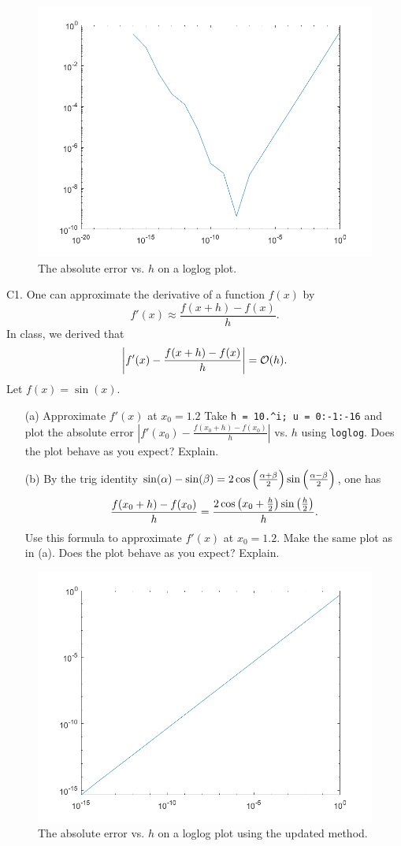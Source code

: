 \documentclass[12pt]{report}
\begin{document}
\begin{figure}
    \center
    \includegraphics[width=.8\textwidth]{plots/c1a.png}
    \caption{The absolute error vs. $h$ on a loglog plot.}
\end{figure}
\begin{problem}
    C1. One can approximate the derivative of a function $f(x)$ by
    \[ 
        f'(x) \approx \frac{f(x + h) - f(x)}{h}.
    \]
    In class, we derived that
    \[ 
        \left| f'(x) - \frac{f(x + h) - f(x)}{h}\right| = {\mathcal{O}}(h).
    \]
    Let $f(x) = \sin(x)$. 
    \begin{enumerate}
        \item [(a)] Approximate $f'(x)$ at $x_0 = 1.2$ Take \verb+h = 10.^i; u = 0:-1:-16+ and plot the absolute error $\left| f'(x_0) - \frac{f(x_0 + h) - f(x_0)}{h} \right|$ vs. $h$ using \verb+loglog+. Does the plot behave as you expect? Explain.
        \item [(b)] By the trig identity $\sin(\alpha) - \sin(\beta) = 2\cos{\left(\frac{\alpha + \beta}{2}\right)}\sin{\left(\frac{\alpha - \beta}{2}\right)}$, one has
        \[ 
            \frac{f(x_0 + h) - f(x_0)}{h} = \frac{2\cos{\left(x_0 + \frac{h}{2}\right)}\sin{\left(\frac{h}{2}\right)}}{h}.
        \]
        Use this formula to approximate $f'(x)$ at $x_0 = 1.2$. Make the same plot as in (a). Does the plot behave as you expect? Explain.
    \end{enumerate}
\end{problem}
\begin{figure}[H]
    \center
    \includegraphics[width=.8\textwidth]{plots/c1b.png}
    \caption{The absolute error vs. $h$ on a loglog plot using the updated method.}
\end{figure}
\end{document}
